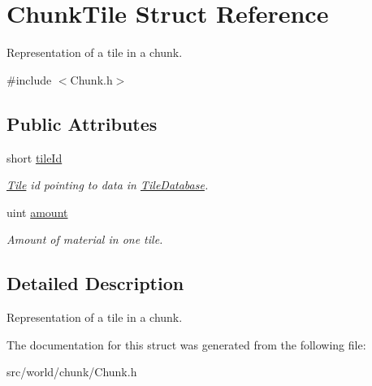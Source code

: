 \hypertarget{structChunkTile}{\section{Chunk\-Tile Struct Reference}
\label{structChunkTile}
}


Representation of a tile in a chunk.  




{\ttfamily \#include $<$Chunk.\-h$>$}

\subsection*{Public Attributes}
\begin{DoxyCompactItemize}
\item 
\hypertarget{structChunkTile_ac7277fa1d196411449a646d3eed73b39}{short \hyperlink{structChunkTile_ac7277fa1d196411449a646d3eed73b39}{tile\-Id}}\label{structChunkTile_ac7277fa1d196411449a646d3eed73b39}

\begin{DoxyCompactList}\small\item\em \hyperlink{classTile}{Tile} id pointing to data in \hyperlink{classTileDatabase}{Tile\-Database}. \end{DoxyCompactList}\item 
\hypertarget{structChunkTile_a29ac3a16c7075941a5c483f1a3372364}{uint \hyperlink{structChunkTile_a29ac3a16c7075941a5c483f1a3372364}{amount}}\label{structChunkTile_a29ac3a16c7075941a5c483f1a3372364}

\begin{DoxyCompactList}\small\item\em Amount of material in one tile. \end{DoxyCompactList}\end{DoxyCompactItemize}


\subsection{Detailed Description}
Representation of a tile in a chunk. 

The documentation for this struct was generated from the following file\-:\begin{DoxyCompactItemize}
\item 
src/world/chunk/Chunk.\-h\end{DoxyCompactItemize}
